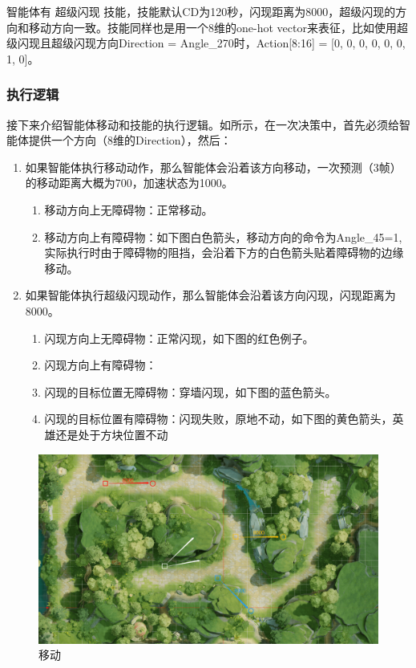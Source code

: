 智能体有 超级闪现 技能，技能默认CD为120秒，闪现距离为8000，超级闪现的方向和移动方向一致。技能同样也是用一个8维的one-hot vector来表征，比如使用超级闪现且超级闪现方向Direction = Angle\_270时，Action[8:16] = [0, 0, 0, 0, 0, 0, 1, 0]。

\subsubsection{执行逻辑}


接下来介绍智能体移动和技能的执行逻辑。如所示，在一次决策中，首先必须给智能体提供一个方向（8维的Direction），然后：

\begin{enumerate}
    \item  如果智能体执行移动动作，那么智能体会沿着该方向移动，一次预测（3帧）的移动距离大概为700，加速状态为1000。
    \begin{enumerate}
\item 移动方向上无障碍物：正常移动。
\item 移动方向上有障碍物：如下图白色箭头，移动方向的命令为Angle\_45=1, 实际执行时由于障碍物的阻挡，会沿着下方的白色箭头贴着障碍物的边缘移动。
    \end{enumerate}

    \item 如果智能体执行超级闪现动作，那么智能体会沿着该方向闪现，闪现距离为8000。

    \begin{enumerate}
\item 闪现方向上无障碍物：正常闪现，如下图的红色例子。
\item 闪现方向上有障碍物：
\item 闪现的目标位置无障碍物：穿墙闪现，如下图的蓝色箭头。
\item 闪现的目标位置有障碍物：闪现失败，原地不动，如下图的黄色箭头，英雄还是处于方块位置不动
    \end{enumerate}
\end{enumerate}


\begin{figure}[H]
    \centering
    \includegraphics[width=0.8\linewidth]{pic/move.png}
    \caption{ 移动}
    \label{move}
\end{figure}

